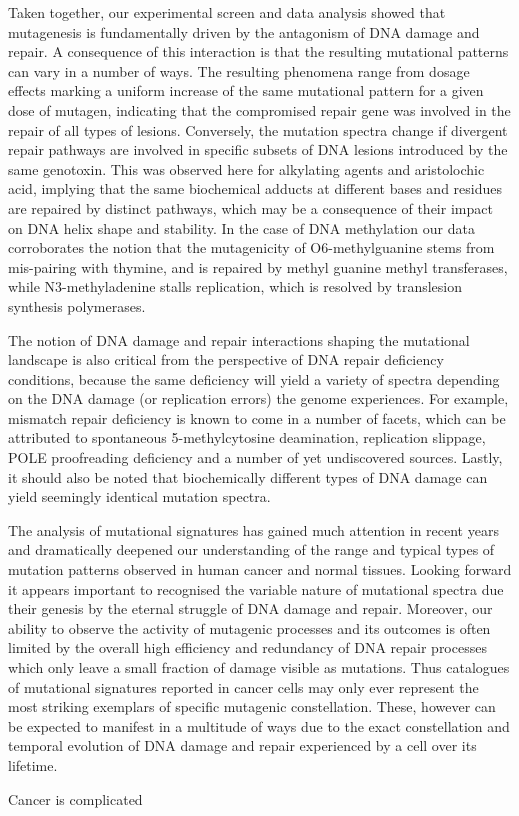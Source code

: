 Taken together, our experimental screen and data analysis showed that mutagenesis is fundamentally driven by the antagonism of DNA damage and repair. A consequence of this interaction is that the resulting mutational patterns can vary in a number of ways. The resulting phenomena range from dosage effects marking a uniform increase of the same mutational pattern for a given dose of mutagen, indicating that the compromised repair gene was involved in the repair of all types of lesions. Conversely, the mutation spectra change if divergent repair pathways are involved in specific subsets of DNA lesions introduced by the same genotoxin. This was observed here for alkylating agents and aristolochic acid, implying that the same biochemical adducts at different bases and residues are repaired by distinct pathways, which may be a consequence of their impact on DNA helix shape and stability. In the case of DNA methylation our data corroborates the notion that the mutagenicity of O6-methylguanine stems from mis-pairing with thymine, and is repaired by methyl guanine methyl transferases, while N3-methyladenine stalls replication, which is resolved by translesion synthesis polymerases.

The notion of DNA damage and repair interactions shaping the mutational landscape is also critical from the perspective of DNA repair deficiency conditions, because the same deficiency will yield a variety of spectra depending on the DNA damage (or replication errors) the genome experiences. For example, mismatch repair deficiency is known to come in a number of facets, which can be attributed to spontaneous 5-methylcytosine deamination, replication slippage, POLE proofreading deficiency and a number of yet undiscovered sources. Lastly, it should also be noted that biochemically different types of DNA damage can yield seemingly identical mutation spectra.

The analysis of mutational signatures has gained much attention in recent years and dramatically deepened our understanding of the range and typical types of mutation patterns observed in human cancer and normal tissues. Looking forward it appears important to recognised the variable nature of mutational spectra due their genesis by the eternal struggle of DNA damage and repair. Moreover, our ability to observe the activity of mutagenic processes and its outcomes is often limited by the overall high efficiency and redundancy of DNA repair processes which only leave a small fraction of damage visible as mutations. Thus catalogues of mutational signatures reported in cancer cells may only ever represent the most striking exemplars of specific mutagenic constellation. These, however can be expected to manifest in a multitude of ways due to the exact constellation and temporal evolution of DNA damage and repair experienced by a cell over its lifetime.


Cancer is complicated

